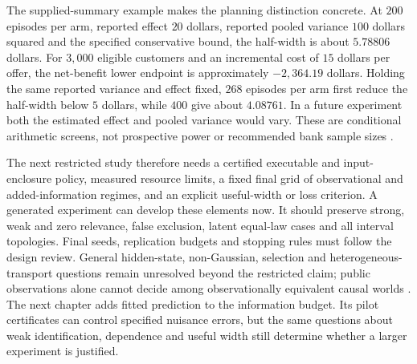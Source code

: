 The supplied-summary example makes the planning distinction concrete.
At $200$ episodes per arm, reported effect $20$ dollars, reported
pooled variance $100$ dollars squared and the specified conservative
bound, the half-width is about $5.78806$ dollars. For $3{,}000$
eligible customers and an incremental cost of $15$ dollars per offer,
the net-benefit lower endpoint is approximately $-2{,}364.19$ dollars.
Holding the same reported variance and effect fixed, $268$ episodes
per arm first reduce the half-width below $5$ dollars, while $400$
give about $4.08761$. In a future experiment both the estimated effect
and pooled variance would vary. These are conditional arithmetic
screens, not prospective power or recommended bank sample sizes
\cite{exec13_temporal_design}.

The next restricted study therefore needs a certified executable and
input-enclosure policy, measured resource limits, a fixed final grid
of observational and added-information regimes, and an explicit
useful-width or loss criterion. A generated experiment can develop
these elements now. It should preserve strong, weak and zero relevance,
false exclusion, latent equal-law cases and all interval topologies.
Final seeds, replication budgets and stopping rules must follow the
design review. General hidden-state, non-Gaussian, selection and
heterogeneous-transport questions remain unresolved beyond the
restricted claim; public observations alone cannot decide among
observationally equivalent causal worlds
\cite{exec13_temporal_design}. The next chapter adds fitted prediction to the information budget. Its pilot certificates can control specified nuisance errors, but the same questions about weak identification, dependence and useful width still determine whether a larger experiment is justified.
\label{exec13:temporal-design-review-end}

